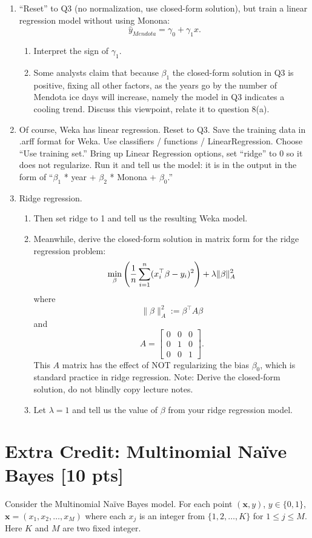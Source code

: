 \documentclass[a4paper]{article}
\theoremstyle{definition}
\begin{document}
\begin{enumerate}
\item 
``Reset'' to Q3 (no normalization,  use closed-form solution), but train a linear regression model without using Monona:
$$\hat y_{Mendota} = \gamma_0 + \gamma_1 x.$$
  \begin{enumerate}
  \item Interpret the sign of $\gamma_1$.
  \item Some analysts claim that because $\beta_1$ the closed-form solution in Q3 is positive, fixing all other factors, as the years go by the number of Mendota ice days will increase, namely the model in Q3 indicates a cooling trend. Discuss this viewpoint, relate it to question 8(a).
  \end{enumerate}

\item
Of course, Weka has linear regression.  Reset to Q3.  Save the training data in .arff format for Weka.  Use classifiers / functions / LinearRegression.  Choose ``Use training set.''  
  Bring up Linear Regression options, set ``ridge'' to 0 so it does not regularize.  Run it and tell us the model: it is in the output in the form of ``$\beta_1$ * year + $\beta_2$ * Monona + $\beta_0$.'' 

\item Ridge regression.
\begin{enumerate}
\item
Then set ridge to 1 and tell us the resulting Weka model.
\item
Meanwhile, derive the closed-form solution in matrix form for the ridge regression problem:
$$\min_\beta \left({1\over n} \sum_{i=1}^n (x_i^\top \beta - y_i)^2 \right) + \lambda \|\beta\|_A^2$$
where 
$$\|\beta\|_A^2 := \beta^\top A \beta$$
and
$$A=
\begin{bmatrix}
0 & 0 & 0 \\
0 & 1 & 0 \\
0 & 0 & 1
\end{bmatrix}.$$
This $A$ matrix has the effect of NOT regularizing the bias $\beta_0$, which is standard practice in ridge regression.
Note: Derive the closed-form solution, do not blindly copy lecture notes.
\item
Let $\lambda=1$ and tell us the value of $\beta$ from your ridge regression model.
\end{enumerate}

\end{enumerate}



\section*{Extra Credit: Multinomial Na\"ive Bayes [10 pts]}
Consider the Multinomial Na\"ive Bayes model. For each point $(\mathbf{x}, y)$, $y \in \{0, 1\}$, $\mathbf{x} = (x_1, x_2, \ldots, x_M)$ where each $x_j$ is an integer from $\{1, 2, \ldots, K\}$ for $1\le j \le M$. Here $K$ and $M$ are two fixed integer. 
\end{document}
